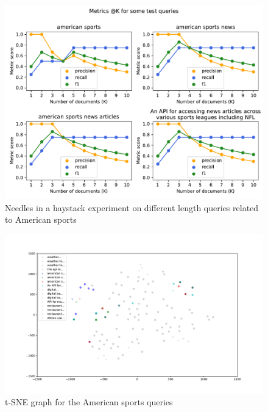 \begin{figure}[!h]
    \begin{center}
        \includegraphics[width=0.8\linewidth]{assets/pdf/evaluation/prec-rec-sports}
    \end{center}

    \caption{Needles in a haystack experiment on different length queries related to American sports}
    \label{fig:nh-3}
\end{figure}

\begin{figure}[!h]
    \begin{center}
        \includegraphics[width=0.8\linewidth]{assets/pdf/evaluation/tsne-sports}
    \end{center}

    \caption{t-SNE graph for the American sports queries}
    \label{fig:tsne-3}
\end{figure}


